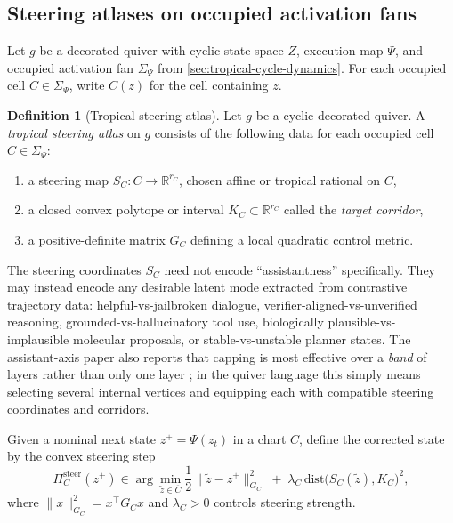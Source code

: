 \documentclass[11pt]{article}
\theoremstyle{definition}
\newtheorem{definition}{Definition}[section]
\theoremstyle{plain}
\theoremstyle{remark}
\newcommand{\R}{\mathbb{R}}
\begin{document}
\subsection{Steering atlases on occupied activation fans}
\label{sec:steering-atlas}

Let $g$ be a decorated quiver with cyclic state space $Z$, execution map $\Psi$, and occupied activation fan $\Sigma_\Psi$ from \cref{sec:tropical-cycle-dynamics}.
For each occupied cell $C\in\Sigma_\Psi$, write $C(z)$ for the cell containing $z$.

\begin{definition}[Tropical steering atlas]
Let $g$ be a cyclic decorated quiver.
A \emph{tropical steering atlas} on $g$ consists of the following data for each occupied cell $C\in\Sigma_\Psi$:
\begin{enumerate}[leftmargin=2em]
\item a steering map $S_C:C\to\R^{r_C}$, chosen affine or tropical rational on $C$,
\item a closed convex polytope or interval $K_C\subset\R^{r_C}$ called the \emph{target corridor},
\item a positive-definite matrix $G_C$ defining a local quadratic control metric.
\end{enumerate}
\end{definition}

The steering coordinates $S_C$ need not encode ``assistantness'' specifically.
They may instead encode any desirable latent mode extracted from contrastive trajectory data:
helpful-vs-jailbroken dialogue, verifier-aligned-vs-unverified reasoning, grounded-vs-hallucinatory tool use, biologically plausible-vs-implausible molecular proposals, or stable-vs-unstable planner states.
The assistant-axis paper also reports that capping is most effective over a \emph{band} of layers rather than only one layer \cite{LuGallagherMichalaFishLindsey2026}; in the quiver language this simply means selecting several internal vertices and equipping each with compatible steering coordinates and corridors.

Given a nominal next state $z^+=\Psi(z_t)$ in a chart $C$, define the corrected state by the convex steering step
\begin{equation}
\Pi^{\mathrm{steer}}_C(z^+)
\in
\arg\min_{\tilde z\in \overline C}
\frac12 \|\tilde z-z^+\|_{G_C}^2
\;+\;
\lambda_C\,\mathrm{dist}\!\bigl(S_C(\tilde z),K_C\bigr)^2,
\label{eq:steering-projection}
\end{equation}
where $\|x\|_{G_C}^2=x^\top G_C x$ and $\lambda_C>0$ controls steering strength.
\end{document}
